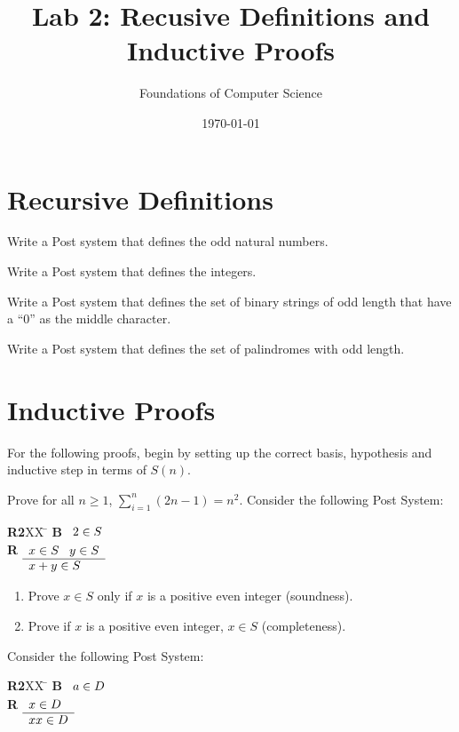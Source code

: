 \documentclass[]{exam}
\title{Lab 2: Recusive Definitions and Inductive Proofs}
\author{Foundations of Computer Science}
\date{\today}
\theoremstyle{definition}
\begin{document}
\maketitle

\begin{questions}

\section*{Recursive Definitions}
\question Write a Post system that defines the odd natural numbers.


\question Write a Post system that defines the integers.

\question Write a Post system that defines the set of binary strings of odd
length that have a ``0'' as the middle character.

\question Write a Post system that defines the set of palindromes with odd
length.


\section*{Inductive Proofs}
For the following proofs, begin by setting up the correct basis, hypothesis
and inductive step in terms of $S(n)$.


\question Prove for all $n \geq 1$, $\sum_{i=1}^{n} (2n - 1) = n^2$. 
\question Consider the following Post System:
\begin{tabbing}
{\bf R2}XX \=  \kill
{\bf B} \>
        \(\begin{array}[t]{l}
        2\in S
        \end{array}\) \\[2ex]
{\bf R} \>
        \(\begin{array}[t]{l}
        x \in S \;\;\;y \in S \\
        \hline
        x + y \in S
        \end{array}\)
\end{tabbing}

\begin{enumerate}[label=\alph*)]
\item Prove $x \in S$ only if $x$ is a positive even integer (soundness). 
\item Prove if $x$ is a positive even integer, $x \in S$ (completeness).
\end{enumerate}

\question Consider the following Post System:
\begin{tabbing}
{\bf R2}XX \=  \kill
{\bf B} \>
        \(\begin{array}[t]{l}
        a \in D
        \end{array}\) \\[2ex]
{\bf R} \>
        \(\begin{array}[t]{l}
        x \in D \\
        \hline
        xx \in D
        \end{array}\) 
\end{tabbing}


\end{questions}
\end{document}
